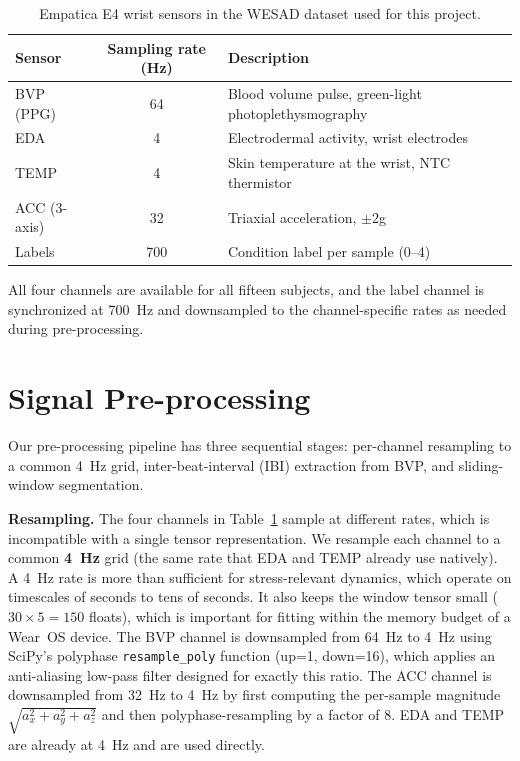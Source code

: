 \begin{table}[H]
\centering
\caption{Empatica E4 wrist sensors in the WESAD dataset
\citep{schmidt2018wesad} used for this project.}
\label{tab:wesad-sensors}
\small
\begin{tabular}{lcp{8cm}}
\toprule
\textbf{Sensor} & \textbf{Sampling rate (Hz)} & \textbf{Description} \\
\midrule
BVP (PPG) & 64 & Blood volume pulse, green-light photoplethysmography \\
EDA & 4 & Electrodermal activity, wrist electrodes \\
TEMP & 4 & Skin temperature at the wrist, NTC thermistor \\
ACC (3-axis) & 32 & Triaxial acceleration, $\pm 2$g \\
Labels & 700 & Condition label per sample (0--4) \\
\bottomrule
\end{tabular}
\end{table}

All four channels are available for all fifteen subjects, and the
label channel is synchronized at 700~Hz and downsampled to the
channel-specific rates as needed during pre-processing.

\section{Signal Pre-processing}
\label{sec:m-pre}

Our pre-processing pipeline has three sequential stages: per-channel
resampling to a common 4~Hz grid, inter-beat-interval (IBI) extraction
from BVP, and sliding-window segmentation.

\textbf{Resampling.} The four channels in Table~\ref{tab:wesad-sensors}
sample at different rates, which is incompatible with a single
tensor representation. We resample each channel to a common \textbf{4~Hz} grid (the same
rate that EDA and TEMP already use natively). A 4~Hz rate is more
than sufficient for stress-relevant dynamics, which operate on
timescales of seconds to tens of seconds. It also keeps the window
tensor small ($30 \times 5 = 150$ floats), which is important for
fitting within the memory budget of a Wear~OS device. The BVP channel
is downsampled from 64~Hz to 4~Hz using SciPy's polyphase
\texttt{resample\_poly} function (up=1, down=16), which applies an
anti-aliasing low-pass filter designed for exactly this ratio. The
ACC channel is downsampled from 32~Hz to 4~Hz by first computing
the per-sample magnitude $\sqrt{a_x^2 + a_y^2 + a_z^2}$ and then
polyphase-resampling by a factor of 8. EDA and TEMP are already at
4~Hz and are used directly.

